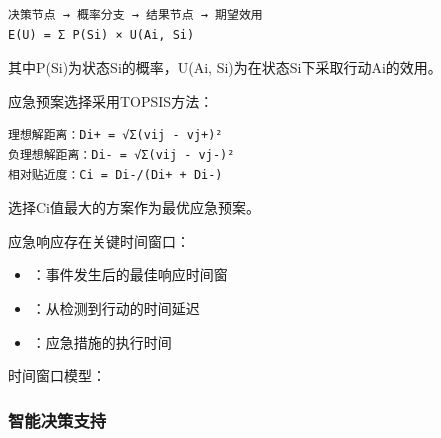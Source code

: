 \begin{lstlisting}
决策节点 → 概率分支 → 结果节点 → 期望效用
E(U) = Σ P(Si) × U(Ai, Si)
\end{lstlisting}

其中P(Si)为状态Si的概率，U(Ai, Si)为在状态Si下采取行动Ai的效用。


应急预案选择采用TOPSIS方法：

\begin{lstlisting}
理想解距离：Di+ = √Σ(vij - vj+)²
负理想解距离：Di- = √Σ(vij - vj-)²
相对贴近度：Ci = Di-/(Di+ + Di-)
\end{lstlisting}

选择Ci值最大的方案作为最优应急预案。


应急响应存在关键时间窗口：

\begin{itemize}
\tightlist
\item
  ：事件发生后的最佳响应时间窗
\item
  ：从检测到行动的时间延迟
\item
  ：应急措施的执行时间
\end{itemize}

时间窗口模型：

\hypertarget{ux667aux80fdux51b3ux7b56ux652fux6301}{%
\subsubsection{智能决策支持}\label{ux667aux80fdux51b3ux7b56ux652fux6301}}

